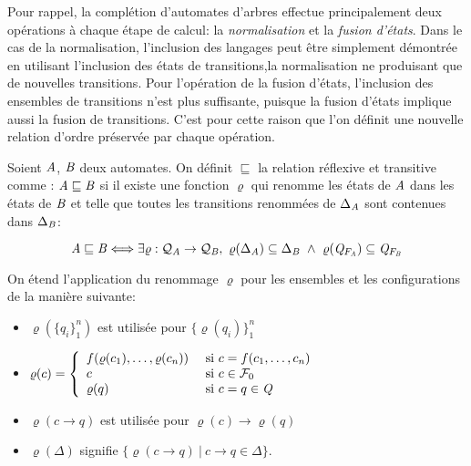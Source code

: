 Pour rappel, la complétion d'automates d'arbres effectue principalement deux opérations
à chaque étape de calcul: la \emph{normalisation} et la \emph{fusion d'états}.
Dans le cas de la normalisation,  l'inclusion des langages peut être simplement
démontrée en utilisant l'inclusion des états de transitions,la normalisation ne produisant 
que de nouvelles transitions.
Pour l'opération de la fusion d'états, l'inclusion des ensembles de transitions n'est plus suffisante,
puisque la fusion d'états implique aussi la fusion de transitions.
C'est pour cette raison que l'on 
définit une nouvelle relation d'ordre préservée par chaque opération.


\begin{definition}
  \label{eq:prop0}
  Soient $\mathit A$, $\mathit B$ deux automates. On définit $\sqsubseteq$ la relation réflexive et transitive 
  comme : $\mathit A \sqsubseteq \mathit B$ si il existe une fonction 
  $\varrho$ qui renomme les états de  $\mathit A$ dans les états de $\mathit B$ et telle que 
  toutes les transitions renommées de  $\Delta_\mathit A$ sont contenues dans  $\Delta_\mathit B$:
  
  \begin{equation}
    \A \sqsubseteq \B \Longleftrightarrow
    \exists \varrho : \mathcal{Q_\A} \rightarrow \mathcal{Q_\B},
    \ \varrho(\Delta_\A) \subseteq \Delta_\B\ \wedge \ \varrho(\Q_{F_\A}) \subseteq \Q_{F_\B}
  \end{equation}
\end{definition}


On étend l'application du renommage $\varrho$ pour les ensembles et les configurations de la manière suivante:
\begin{itemize}
\item $\varrho(\{q_i\}_1^n)$ est utilisée pour  $\{\varrho(q_i)\}_1^n$

\item $\varrho(c) = \left\{\begin{array}{ll}
      f (\varrho(c_1), \dots, \varrho(c_n)) &\textrm{ si } c = f(c_1, \dots, c_n)\\
      c &\textrm{ si } c \in \mathcal{F}_{0}\\
      \varrho(q) &\textrm{ si } c = q\in \mathit Q\\
    \end{array}\right.$
  
\item $\varrho(c \rightarrow q)$ est utilisée pour  $\varrho(c) \rightarrow \varrho(q)$


\item $\varrho(\Delta)$ signifie $\{ \varrho(c\rightarrow q)\ |\ c \rightarrow q \in \Delta \}$.
\end{itemize}


